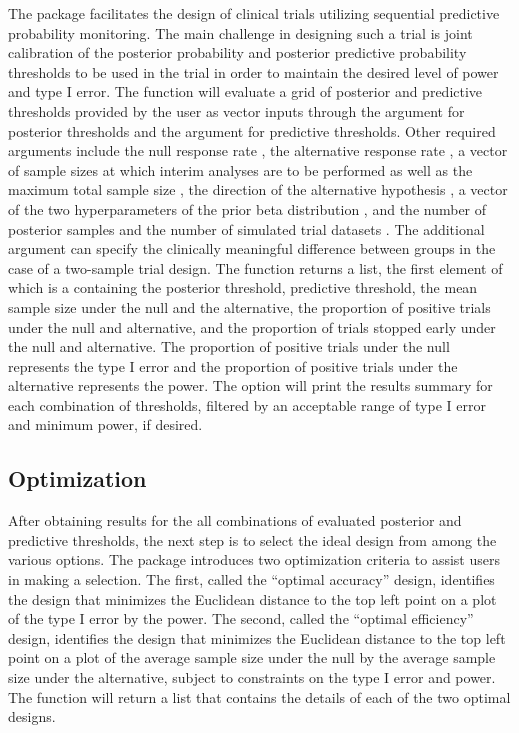 The  package facilitates the design of clinical trials
utilizing sequential predictive probability monitoring. The main
challenge in designing such a trial is joint calibration of the
posterior probability and posterior predictive probability thresholds to
be used in the trial in order to maintain the desired level of power and
type I error. The  function will evaluate
a grid of posterior and predictive thresholds provided by the user as
vector inputs through the argument  for posterior
thresholds and the argument  for predictive
thresholds. Other required arguments include the null response rate
, the alternative response rate , a vector of
sample sizes at which interim analyses are to be performed  as
well as the maximum total sample size , the direction of the
alternative hypothesis , a vector of the two
hyperparameters of the prior beta distribution , and the
number of posterior samples  and the number of simulated trial
datasets . The additional argument  can specify
the clinically meaningful difference between groups in the case of a
two-sample trial design. The function returns a list, the first element
of which is a  containing the posterior threshold,
predictive threshold, the mean sample size under the null and the
alternative, the proportion of positive trials under the null and
alternative, and the proportion of trials stopped early under the null
and alternative. The proportion of positive trials under the null
represents the type I error and the proportion of positive trials under
the alternative represents the power. The  option will
print the results summary for each combination of thresholds, filtered
by an acceptable range of type I error and minimum power, if desired.

\hypertarget{optimization}{%
\subsection{Optimization}\label{optimization}}

After obtaining results for the all combinations of evaluated posterior
and predictive thresholds, the next step is to select the ideal design
from among the various options. The  package introduces two
optimization criteria to assist users in making a selection. The first,
called the ``optimal accuracy'' design, identifies the design that
minimizes the Euclidean distance to the top left point on a plot of the
type I error by the power. The second, called the ``optimal efficiency''
design, identifies the design that minimizes the Euclidean distance to
the top left point on a plot of the average sample size under the null
by the average sample size under the alternative, subject to constraints
on the type I error and power. The  function
will return a list that contains the details of each of the two optimal
designs.

